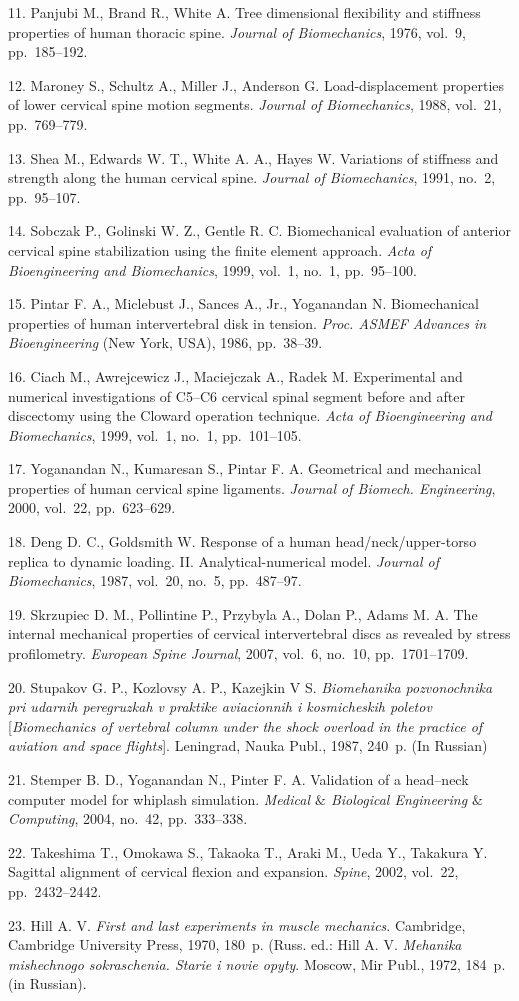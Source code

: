 {11. Panjubi M., Brand R., White A. Tree dimensional flexibility
and stiffness properties of human thoracic spine. {\it Journal of
Biomechanics}, 1976, vol.~9, pp.~185--192.

12.  Maroney S., Schultz A., Miller J., Anderson G.
Load-displacement properties of lower cervical spine motion
segments. {\it Journal of Biomechanics}, 1988, vol.~21,
pp.~769--779.

13. Shea M., Edwards W. T., White A. A., Hayes W. Variations of
stiffness and strength along the human cervical spine. {\it
Journal of Biomechanics}, 1991, no.~2, pp.~95--107.

14. Sobczak P., Golinski W. Z., Gentle R. C. Biomechanical
evaluation of anterior cervical spine stabilization using the
finite element approach. {\it Acta of Bioengineering and
Biomechanics}, 1999, vol.~1, no.~1, pp.~95--100.

15. Pintar F. A., Miclebust J., Sances A., Jr., Yoganandan N.
Biomechanical properties of human intervertebral disk in tension.
{\it Proc. ASMEF Advances in Bioengineering} (New York, USA),
1986, pp.~38--39.

16. Ciach M., Awrejcewicz J., Maciejczak A., Radek M. Experimental
and numerical investigations of C5--C6 cervical spinal segment
before and after discectomy using the Cloward operation technique.
{\it Acta of Bioengineering and Biomechanics}, 1999, vol.~1,
no.~1, pp.~101--105.

17. Yoganandan N., Kumaresan S., Pintar F. A. Geometrical and
mechanical properties of human cervical spine ligaments. {\it
Journal of Biomech. Engineering}, 2000, vol.~22, pp.~623--629.

18. Deng D. C., Goldsmith W. Response of a human
head/neck/upper-torso replica to dynamic loading. II.
Analytical-numerical model. {\it Journal of Biomechanics}, 1987,
vol.~20, no.~5, pp.~487--97.

19. Skrzupiec D. M., Pollintine P., Przybyla A., Dolan P., Adams
M. A. The internal mechanical properties of cervical
intervertebral discs as revealed by stress profilometry. {\it
European Spine Journal}, 2007, vol.~6, no.~10, pp.~1701--1709.

20. Stupakov G. P., Kozlovsy A. P., Kazejkin V S. {\it Biomehanika
pozvonochnika pri udarnih peregruzkah v praktike aviacionnih i
kosmicheskih poletov} [{\it Biomechanics of vertebral column under
the shock overload in the practice of aviation and space
flights}]. Leningrad, Nauka Publ., 1987, 240~p. (In Russian)

21. Stemper B. D., Yoganandan N., Pinter F. A. Validation of a
head--neck computer model for whiplash simulation. {\it Medical
$\&$ Biological Engineering $\&$ Computing}, 2004, no.~42,
pp.~333--338.

22. Takeshima T., Omokawa S., Takaoka T., Araki M., Ueda Y.,
Takakura Y. Sagittal alignment of cervical flexion and expansion.
{\it Spine}, 2002, vol.~22, pp.~2432--2442.

23. Hill A. V.  {\it  First and last experiments in muscle
mechanics}. Cambridge, Cambridge University Press, 1970, 180~p.
(Russ. ed.: Hill A. V. {\it Mehanika mishechnogo sokraschenia.
Starie i novie opyty}. Moscow, Mir Publ., 1972, 184~p. (in
Russian).




}
